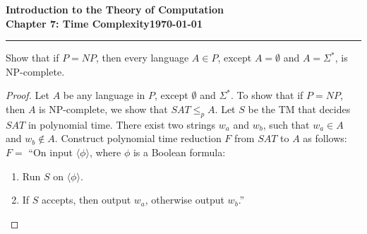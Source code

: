 \documentclass[11pt]{article}
\newcommand{\dated}{\today}
\begin{document}
\textbf{Introduction to the Theory of
Computation}\hfill\textbf{\myname}\\[0.01in]
\textbf{Chapter 7: Time Complexity}\hfill\textbf{\dated}\\
\smallskip\hrule\bigskip

\begin{problem}{7.18}
Show that if $P = NP$, then every language $A \in P$, except $A = \emptyset$ and $A = \Sigma^{*}$, is NP-complete.
\end{problem}

\begin{proof}Let $A$ be any language in $P$, except $\emptyset$ and $\Sigma^{*}$. To show that if $P = NP$, then $A$ is NP-complete, we show that $SAT \leq_p A$. Let $S$ be the TM that decides $SAT$ in polynomial time. There exist two strings $w_a$ and $w_b$, such that $w_a \in A$ and $w_b \notin A$. Construct polynomial time reduction $F$ from $SAT$ to $A$ as follows: \\

$F =$ \textquotedblleft On input $\langle \phi \rangle$, where $\phi$ is a Boolean formula:
\begin{enumerate}
\item Run $S$ on $\langle \phi \rangle$.
\item If $S$ accepts, then output $w_a$, otherwise output $w_b$.\textquotedblright
\end{enumerate}
\end{proof}
\end{document}
